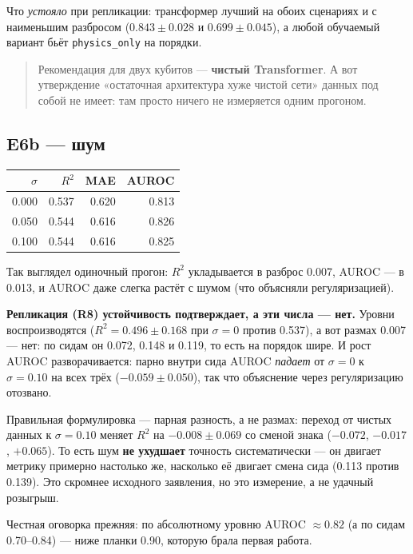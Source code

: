 \documentclass[12pt,a4paper]{article}
\newcommand{\code}[1]{\texttt{#1}}
\begin{document}
Что \emph{устояло} при репликации: трансформер лучший на обоих сценариях и с
наименьшим разбросом ($0.843 \pm 0.028$ и $0.699 \pm 0.045$), а любой
обучаемый вариант бьёт \code{physics\_only} на порядки.

\begin{quote}
Рекомендация для двух кубитов — \textbf{чистый Transformer}. А вот
утверждение «остаточная архитектура хуже чистой сети» данных под собой не
имеет: там просто ничего не измеряется одним прогоном.
\end{quote}

\subsection{E6b — шум}

\begin{center}
\begin{tabular}{@{}rrrr@{}}
\toprule
$\sigma$ & $R^2$ & MAE & AUROC \\
\midrule
0.000 & 0.537 & 0.620 & 0.813 \\
0.050 & 0.544 & 0.616 & 0.826 \\
0.100 & 0.544 & 0.616 & 0.825 \\
\bottomrule
\end{tabular}
\end{center}

Так выглядел одиночный прогон: $R^2$ укладывается в разброс 0.007, AUROC — в
0.013, и AUROC даже слегка растёт с шумом (что объясняли регуляризацией).

\textbf{Репликация (R8) устойчивость подтверждает, а эти числа — нет.} Уровни
воспроизводятся ($R^2 = 0.496\pm0.168$ при $\sigma=0$ против 0.537), а вот
размах 0.007 — нет: по сидам он 0.072, 0.148 и 0.119, то есть на порядок шире.
И рост AUROC разворачивается: парно внутри сида AUROC \emph{падает} от
$\sigma=0$ к $\sigma=0.10$ на всех трёх ($-0.059\pm0.050$), так что объяснение
через регуляризацию отозвано.

Правильная формулировка — парная разность, а не размах: переход от чистых
данных к $\sigma=0.10$ меняет $R^2$ на $-0.008\pm0.069$ со сменой знака
($-0.072$, $-0.017$, $+0.065$). То есть шум \textbf{не ухудшает} точность
систематически — он двигает метрику примерно настолько же, насколько её двигает
смена сида (0.113 против 0.139). Это скромнее исходного заявления, но это
измерение, а не удачный розыгрыш.

Честная оговорка прежняя: по абсолютному уровню AUROC $\approx 0.82$ (а по
сидам 0.70–0.84) — ниже планки 0.90, которую брала первая работа.
\end{document}
